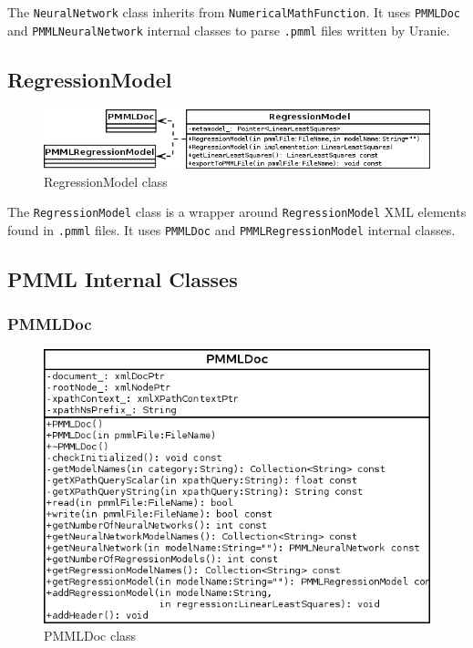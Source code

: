 The \texttt{NeuralNetwork} class inherits from \texttt{NumericalMathFunction}.
It uses \texttt{PMMLDoc} and \texttt{PMMLNeuralNetwork} internal classes to parse \texttt{.pmml} files written by Uranie.

\subsection{RegressionModel}

\begin{figure}[htb]
  \begin{center}
    \includegraphics[scale=0.8]{RegressionModel.png}
    \caption{RegressionModel class}\label{fig:archi:RegressionModel}
  \end{center}
\end{figure}

The \texttt{RegressionModel} class is a wrapper around \texttt{RegressionModel} XML elements found in \texttt{.pmml} files.
It uses \texttt{PMMLDoc} and \texttt{PMMLRegressionModel} internal classes.

\subsection{PMML Internal Classes}

\subsubsection{PMMLDoc}

\begin{figure}[htb]
  \begin{center}
    \includegraphics[scale=0.8]{PMMLDoc.png}
    \caption{PMMLDoc class}\label{fig:archi:PMMLDoc}
  \end{center}
\end{figure}

